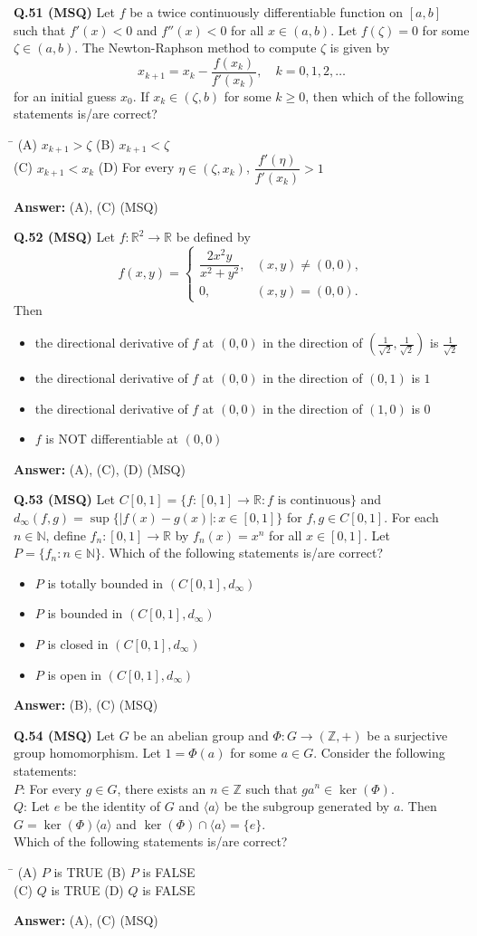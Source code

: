 \documentclass[11pt,a4paper]{article}
\newcommand{\optsfourA}[4]{%
  \begin{tabbing}
    \hspace{0.48\linewidth}\=\kill
    (A) #1 \> (B) #2 \\[2pt]
    (C) #3 \> (D) #4
  \end{tabbing}%
}
\newcommand{\optslistA}[4]{%
  \begin{itemize}
    \setlength{\itemsep}{2pt}\setlength{\parskip}{0pt}
    \item[(A)] #1
    \item[(B)] #2
    \item[(C)] #3
    \item[(D)] #4
  \end{itemize}%
}
\newcommand{\ans}[1]{\textbf{Answer:} #1\par\medskip}
\begin{document}
\textbf{Q.51 (MSQ)} Let $f$ be a twice continuously differentiable function on $[a, b]$ such that $f'(x) < 0$ and $f''(x) < 0$ for all $x \in (a, b)$. Let $f(\zeta) = 0$ for some $\zeta \in (a, b)$. The Newton-Raphson method to compute $\zeta$ is given by
\[
  x_{k+1} = x_k - \frac{f(x_k)}{f'(x_k)}, \quad k = 0, 1, 2, \ldots
\]
for an initial guess $x_0$. If $x_k \in (\zeta, b)$ for some $k \ge 0$, then which of the following statements is/are correct?
\optsfourA{$x_{k+1} > \zeta$}{$x_{k+1} < \zeta$}{$x_{k+1} < x_k$}{For every $\eta \in (\zeta, x_k)$, $\dfrac{f'(\eta)}{f'(x_k)} > 1$}
\ans{(A), (C) (MSQ)}

\textbf{Q.52 (MSQ)} Let $f : \mathbb{R}^2 \to \mathbb{R}$ be defined by
\[
  f(x, y) = \begin{cases} \dfrac{2x^2 y}{x^2 + y^2}, & (x, y) \ne (0, 0), \\ 0, & (x, y) = (0, 0). \end{cases}
\]
Then
\optslistA{the directional derivative of $f$ at $(0, 0)$ in the direction of $\left(\frac{1}{\sqrt{2}}, \frac{1}{\sqrt{2}}\right)$ is $\frac{1}{\sqrt{2}}$}{the directional derivative of $f$ at $(0, 0)$ in the direction of $(0, 1)$ is $1$}{the directional derivative of $f$ at $(0, 0)$ in the direction of $(1, 0)$ is $0$}{$f$ is NOT differentiable at $(0, 0)$}
\ans{(A), (C), (D) (MSQ)}

\textbf{Q.53 (MSQ)} Let $C[0, 1] = \{f : [0, 1] \to \mathbb{R} : f \text{ is continuous}\}$ and $d_\infty(f, g) = \sup\{|f(x) - g(x)| : x \in [0, 1]\}$ for $f, g \in C[0, 1]$. For each $n \in \mathbb{N}$, define $f_n : [0, 1] \to \mathbb{R}$ by $f_n(x) = x^n$ for all $x \in [0, 1]$. Let $P = \{f_n : n \in \mathbb{N}\}$. Which of the following statements is/are correct?
\optslistA{$P$ is totally bounded in $(C[0, 1], d_\infty)$}{$P$ is bounded in $(C[0, 1], d_\infty)$}{$P$ is closed in $(C[0, 1], d_\infty)$}{$P$ is open in $(C[0, 1], d_\infty)$}
\ans{(B), (C) (MSQ)}

\textbf{Q.54 (MSQ)} Let $G$ be an abelian group and $\Phi : G \to (\mathbb{Z}, +)$ be a surjective group homomorphism. Let $1 = \Phi(a)$ for some $a \in G$. Consider the following statements:\\
$P$: For every $g \in G$, there exists an $n \in \mathbb{Z}$ such that $g a^n \in \ker(\Phi)$.\\
$Q$: Let $e$ be the identity of $G$ and $\langle a \rangle$ be the subgroup generated by $a$. Then $G = \ker(\Phi)\langle a \rangle$ and $\ker(\Phi) \cap \langle a \rangle = \{e\}$.\\
Which of the following statements is/are correct?
\optsfourA{$P$ is TRUE}{$P$ is FALSE}{$Q$ is TRUE}{$Q$ is FALSE}
\ans{(A), (C) (MSQ)}
\end{document}

